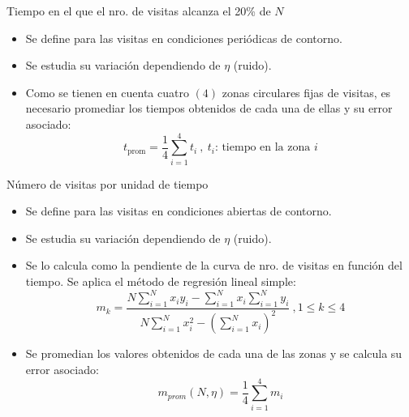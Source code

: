 \documentclass{beamer}
\begin{document}
            \begin{frame}{Tiempo en el que el nro. de visitas alcanza el 20\% de $N$ }
                \begin{itemize}
                    \item Se define para las visitas en condiciones periódicas de contorno.
                    \item Se estudia su variación dependiendo de $\eta$ (ruido).
                    \item Como se tienen en cuenta cuatro $(4)$ zonas circulares fijas de visitas, es necesario promediar
                    los tiempos obtenidos de cada una de ellas y su error asociado:
                    \begin{equation*}
                        t_{\text{prom}} = \frac{1}{4} \sum_{i=1}^{4} t_i \ ,\ t_i\text{: tiempo en la zona }i
                    \end{equation*}
                \end{itemize}
            \end{frame}

            \begin{frame}{Número de visitas por unidad de tiempo}
                \begin{itemize}
                    \item Se define para las visitas en condiciones abiertas de contorno.
                    \item Se estudia su variación dependiendo de $\eta$ (ruido).
                    \item Se lo calcula como la pendiente de la curva de nro. de visitas en función del tiempo.
                    Se aplica el método de regresión lineal simple:
                    \begin{equation*}
                        m_k = \frac{N \sum_{i=1}^N x_i y_i - \sum_{i=1}^N x_i \sum_{i=1}^N y_i }{N \sum_{i=1}^N x_i^2 - \left(\sum_{i=1}^N x_i \right)^2}
                        \ , 1 \leq k \leq 4
                    \end{equation*}
                    \item Se promedian los valores obtenidos de cada una de las zonas y se calcula su error asociado:
                    \begin{equation*}
                        m_{prom}(N,\eta) = \frac{1}{4} \sum_{i=1}^{4} m_i
                    \end{equation*}
                \end{itemize}
            \end{frame}
\end{document}
